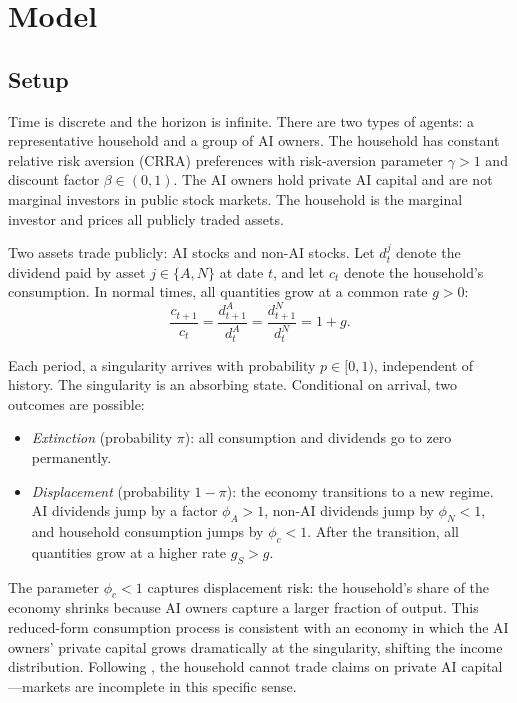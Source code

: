 \documentclass[12pt]{article}
\begin{document}
\section{Model}

\subsection{Setup}

Time is discrete and the horizon is infinite.
There are two types of agents: a representative household and a group of AI owners.
The household has constant relative risk aversion (CRRA) preferences with risk-aversion parameter $\gamma > 1$ and discount factor $\beta \in (0,1)$.
The AI owners hold private AI capital and are not marginal investors in public stock markets.
The household is the marginal investor and prices all publicly traded assets.

Two assets trade publicly: AI stocks and non-AI stocks.
Let $d_t^j$ denote the dividend paid by asset $j \in \{A, N\}$ at date $t$, and let $c_t$ denote the household's consumption.
In normal times, all quantities grow at a common rate $g > 0$:
%
\begin{equation}
\frac{c_{t+1}}{c_t} = \frac{d_{t+1}^A}{d_t^A} = \frac{d_{t+1}^N}{d_t^N} = 1 + g.
\label{eq:normal_growth} %
\end{equation}

Each period, a singularity arrives with probability $p \in [0,1)$, independent of history.
The singularity is an absorbing state.
Conditional on arrival, two outcomes are possible:
\begin{itemize}
\item \textit{Extinction} (probability $\pi$): all consumption and dividends go to zero permanently.
\item \textit{Displacement} (probability $1 - \pi$): the economy transitions to a new regime.  AI dividends jump by a factor $\phi_A > 1$, non-AI dividends jump by $\phi_N < 1$, and household consumption jumps by $\phi_c < 1$.  After the transition, all quantities grow at a higher rate $g_S > g$.
\end{itemize}
The parameter $\phi_c < 1$ captures displacement risk: the household's share of the economy shrinks because AI owners capture a larger fraction of output.
This reduced-form consumption process is consistent with an economy in which the AI owners' private capital grows dramatically at the singularity, shifting the income distribution.
Following \citet{GKP2012}, the household cannot trade claims on private AI capital---markets are incomplete in this specific sense.
\end{document}
